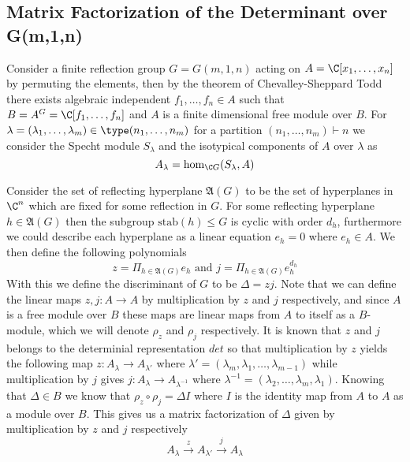 \documentclass[../MT.tex]{subfiles}
\begin{document}
\subsection*{Matrix Factorization of the Determinant over G(m,1,n)}
Consider a finite reflection group $ G = G(m,1,n) $ acting on $ A = \C[x_1,\hdots,x_n] $ by permuting the elements, then by the theorem of Chevalley-Sheppard Todd there exists algebraic independent $ f_1,\hdots,f_n \in A $ such that $ B = A^G = \C[f_1,\hdots,f_n] $ and $ A $ is a finite dimensional free module over $ B $. For $ \lambda = (\lambda_1,\hdots,\lambda_m) \in \type(n_1,\hdots,n_m) $ for a partition $ (n_1,\hdots,n_m) \vdash n $ we consider the Specht module $ S_\lambda $ and the isotypical components of $ A $ over $ \lambda $ as 
\[ A_\lambda = \hom_{\C G}(S_\lambda,A)\]


Consider the set of reflecting hyperplane $ \mathfrak{A}(G) $ to be the set of hyperplanes in $ \C^n $ which are fixed for some reflection in $ G $. For some reflecting hyperplane $ h \in \mathfrak{A}(G) $ then the subgroup $ \text{stab}(h) \leq G $ is cyclic with order $ d_h $, furthermore we could describe each hyperplane as a linear equation $ e_h = 0 $ where $ e_h \in A $. We then define the following polynomials 
\[z = \Pi_{h\in \mathfrak{A}(G)} e_h  \text{ and } j = \Pi_{h\in \mathfrak{A}(G)} e_h^{d_h}\]
With this we define the discriminant of $ G $ to be $ \Delta = zj $. Note that we can define the linear maps $ z,j: A \to A $ by multiplication by $ z $ and $ j $ respectively, and since $ A $ is a free module over $ B $ these maps are linear maps from $ A $ to itself as a $ B $-module, which we will denote $ \rho_z $ and $ \rho_j $ respectively. It is known that $ z $ and $ j $ belongs to the determinial representation $ det $ so that multiplication by $ z $ yields the following map $ z:A_\lambda  \to A_{\lambda'} $ where $ \lambda' = (\lambda_{m},\lambda_1,\hdots,\lambda_{m-1}) $ while multiplication by $ j $ gives $ j:A_\lambda \to A_{\lambda^{-1}} $ where $ \lambda^{-1} = (\lambda_2,\hdots,\lambda_m,\lambda_1) $. Knowing that $ \Delta \in B$ we know that $ \rho_z\circ\rho_j = \Delta I $ where $ I $ is the identity map from $ A $ to $ A $ as a module over $ B $. This gives us a matrix factorization of $ \Delta $ given by multiplication by $ z $ and $ j $ respectively
\[A_\lambda \xrightarrow{z} A_{\lambda'} \xrightarrow{j} A_\lambda\]
\end{document}
